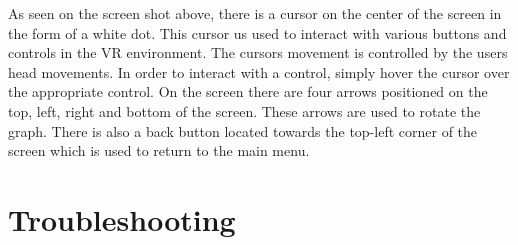 \documentclass[english]{article}
\begin{document}
\begin{flushleft}
As seen on the screen shot above, there is a cursor on the center of the screen in the form of a white dot. This cursor us used to interact with various buttons and controls in the VR environment. The cursors movement is controlled by the users head movements. In order to interact with a control, simply hover the cursor over the appropriate control. On the screen there are four arrows positioned on the top, left, right and bottom of the screen. These arrows are used to rotate the graph. There is also a back button located towards the top-left corner of the screen which is used to return to the main menu.
\end{flushleft}

\section{Troubleshooting}
\end{document}

